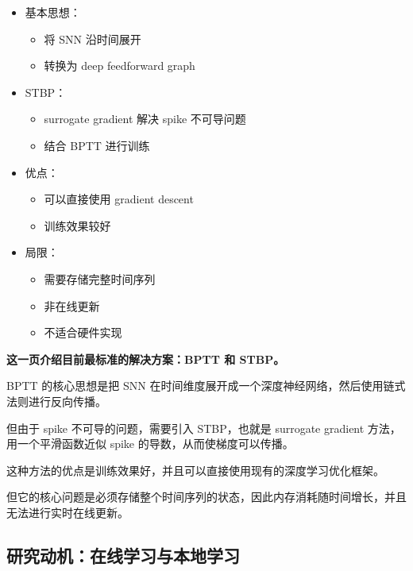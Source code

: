 \documentclass[journal,12pt,onecolumn]{IEEEtran}
\begin{document}
\begin{itemize}
  \item 基本思想：
  \begin{itemize}
    \item 将 SNN 沿时间展开
    \item 转换为 deep feedforward graph
  \end{itemize}

  \item STBP：
  \begin{itemize}
    \item surrogate gradient 解决 spike 不可导问题
    \item 结合 BPTT 进行训练
  \end{itemize}

  \item 优点：
  \begin{itemize}
    \item 可以直接使用 gradient descent
    \item 训练效果较好
  \end{itemize}

  \item 局限：
  \begin{itemize}
    \item 需要存储完整时间序列
    \item 非在线更新
    \item 不适合硬件实现
  \end{itemize}
\end{itemize}



\textbf{这一页介绍目前最标准的解决方案：BPTT 和 STBP。}

BPTT 的核心思想是把 SNN 在时间维度展开成一个深度神经网络，然后使用链式法则进行反向传播。

但由于 spike 不可导的问题，需要引入 STBP，也就是 surrogate gradient 方法，用一个平滑函数近似 spike 的导数，从而使梯度可以传播。

这种方法的优点是训练效果好，并且可以直接使用现有的深度学习优化框架。

但它的核心问题是必须存储整个时间序列的状态，因此内存消耗随时间增长，并且无法进行实时在线更新。



\subsection{研究动机：在线学习与本地学习}
\end{document}
